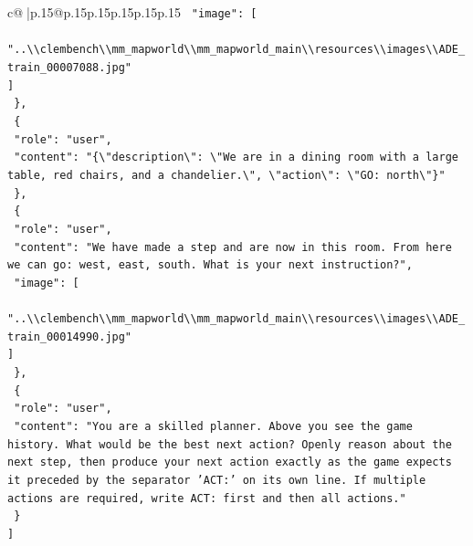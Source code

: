 \documentclass{article}
\begin{document}
{\begin{supertabular}{c@{$\;$}|p{.15\linewidth}@{}p{.15\linewidth}p{.15\linewidth}p{.15\linewidth}p{.15\linewidth}p{.15\linewidth}}
{{{\texttt{    "image": {[}} \\
\texttt{      "..\textbackslash{}\textbackslash{}clembench\textbackslash{}\textbackslash{}mm\_mapworld\textbackslash{}\textbackslash{}mm\_mapworld\_main\textbackslash{}\textbackslash{}resources\textbackslash{}\textbackslash{}images\textbackslash{}\textbackslash{}ADE\_train\_00007088.jpg"} \\
\texttt{    {]}} \\
\texttt{  \},} \\
\texttt{  \{} \\
\texttt{    "role": "user",} \\
\texttt{    "content": "\{\textbackslash{}"description\textbackslash{}": \textbackslash{}"We are in a dining room with a large table, red chairs, and a chandelier.\textbackslash{}", \textbackslash{}"action\textbackslash{}": \textbackslash{}"GO: north\textbackslash{}"\}"} \\
\texttt{  \},} \\
\texttt{  \{} \\
\texttt{    "role": "user",} \\
\texttt{    "content": "We have made a step and are now in this room. From here we can go: west, east, south. What is your next instruction?",} \\
\texttt{    "image": {[}} \\
\texttt{      "..\textbackslash{}\textbackslash{}clembench\textbackslash{}\textbackslash{}mm\_mapworld\textbackslash{}\textbackslash{}mm\_mapworld\_main\textbackslash{}\textbackslash{}resources\textbackslash{}\textbackslash{}images\textbackslash{}\textbackslash{}ADE\_train\_00014990.jpg"} \\
\texttt{    {]}} \\
\texttt{  \},} \\
\texttt{  \{} \\
\texttt{    "role": "user",} \\
\texttt{    "content": "You are a skilled planner. Above you see the game history. What would be the best next action? Openly reason about the next step, then produce your next action exactly as the game expects it preceded by the separator 'ACT:' on its own line. If multiple actions are required, write ACT: first and then all actions."} \\
\texttt{  \}} \\
\texttt{{]}} \\
            }
        }
    }
     \\ \\


\end{supertabular}}
\end{document}
